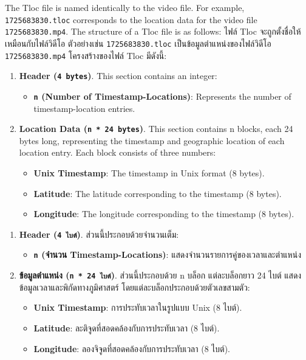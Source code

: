 \ifenglish
The Tloc file is named identically to the video file. For example, \texttt{1725683830.tloc} corresponds to the location data for the video file \texttt{1725683830.mp4}. The structure of a Tloc file is as follows:
\else
ไฟล์ Tloc จะถูกตั้งชื่อให้เหมือนกับไฟล์วิดีโอ ตัวอย่างเช่น \texttt{1725683830.tloc} เป็นข้อมูลตำแหน่งของไฟล์วิดีโอ \texttt{1725683830.mp4} โครงสร้างของไฟล์ Tloc มีดังนี้:
\fi
\ifenglish
\begin{enumerate}
    \item \textbf{Header (\texttt{4 bytes})}. This section contains an integer:
    \begin{itemize}
        \item \textbf{\texttt{n} (Number of Timestamp-Locations)}: Represents the number of timestamp-location entries.
    \end{itemize}
    
    \item \textbf{Location Data (\texttt{n * 24 bytes})}. This section contains n blocks, each 24 bytes long, representing the timestamp and geographic location of each location entry. Each block consists of three numbers:
    \begin{itemize}
        \item \textbf{Unix Timestamp}: The timestamp in Unix format (8 bytes).
        \item \textbf{Latitude}: The latitude corresponding to the timestamp (8 bytes).
        \item \textbf{Longitude}: The longitude corresponding to the timestamp (8 bytes).
    \end{itemize}
\end{enumerate}
\else
\begin{enumerate}
    \item \textbf{Header (\texttt{4 ไบต์})}. ส่วนนี้ประกอบด้วยจำนวนเต็ม:
    \begin{itemize}
        \item \textbf{\texttt{n} (จำนวน Timestamp-Locations)}: แสดงจำนวนรายการคู่ของเวลาและตำแหน่ง
    \end{itemize}
    
    \item \textbf{ข้อมูลตำแหน่ง (\texttt{n * 24 ไบต์})}. ส่วนนี้ประกอบด้วย n บล็อก แต่ละบล็อกยาว 24 ไบต์ แสดงข้อมูลเวลาและพิกัดทางภูมิศาสตร์ โดยแต่ละบล็อกประกอบด้วยตัวเลขสามตัว:
    \begin{itemize}
        \item \textbf{Unix Timestamp}: การประทับเวลาในรูปแบบ Unix (8 ไบต์).
        \item \textbf{Latitude}: ละติจูดที่สอดคล้องกับการประทับเวลา (8 ไบต์).
        \item \textbf{Longitude}: ลองจิจูดที่สอดคล้องกับการประทับเวลา (8 ไบต์).
    \end{itemize}
\end{enumerate}
\fi



